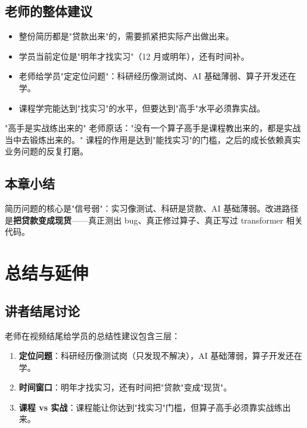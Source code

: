 \documentclass[a4paper]{article}
\begin{document}
\subsection{老师的整体建议}

\begin{itemize}
\item 整份简历都是"贷款出来"的，需要抓紧把实际产出做出来。
\item 学员当前定位是"明年才找实习"（12 月或明年），还有时间补。
\item 老师给学员"定定位问题"：科研经历像测试岗、AI 基础薄弱、算子开发还在学。
\item 课程学完能达到"找实习"的水平，但要达到"高手"水平必须靠实战。
\end{itemize}

\begin{importantbox}{"高手是实战练出来的"}
老师原话："没有一个算子高手是课程教出来的，都是实战当中去锻炼出来的。" 课程的作用是达到"能找实习"的门槛，之后的成长依赖真实业务问题的反复打磨。
\end{importantbox}

\subsection{本章小结}

简历问题的核心是"信号弱"：实习像测试、科研是贷款、AI 基础薄弱。改进路径是\textbf{把贷款变成现货}——真正测出 bug、真正修过算子、真正写过 transformer 相关代码。

\section{总结与延伸}

\subsection{讲者结尾讨论}

老师在视频结尾给学员的总结性建议包含三层：

\begin{enumerate}
\item \textbf{定位问题}：科研经历像测试岗（只发现不解决），AI 基础薄弱，算子开发还在学。
\item \textbf{时间窗口}：明年才找实习，还有时间把"贷款"变成"现货"。
\item \textbf{课程 vs 实战}：课程能让你达到"找实习"门槛，但算子高手必须靠实战练出来。
\end{enumerate}
\end{document}

